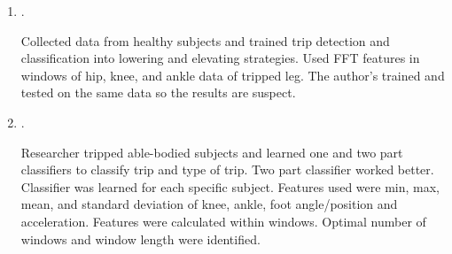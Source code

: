 \begin{enumerate} 
    \item {}. 

   
    Collected data from healthy subjects and trained trip detection and
    classification into lowering and elevating strategies. Used FFT features
    in windows of hip, knee, and ankle data of tripped leg. The author's trained
    and tested on the same data so the results are suspect.

    \item {}. 

    
    Researcher tripped able-bodied subjects and learned one and two part
    classifiers to classify trip and type of trip. Two part classifier worked
    better. Classifier was learned for each specific subject. Features used were
    min, max, mean, and standard deviation of knee, ankle, foot angle/position
    and acceleration. Features were calculated within windows. Optimal number of
    windows and window length were identified.

\end{enumerate}
